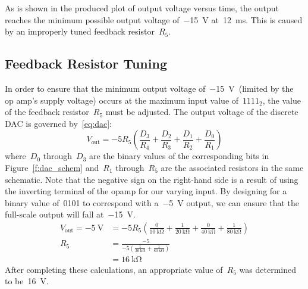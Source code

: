 %
As is shown in the produced plot of output voltage versus time, the output
reaches the minimum possible output voltage of~\SI{-15}{\volt}
at~\SI{12}{\milli\second}.  This is caused by an improperly tuned feedback
resistor~$R_5$.

\subsection{Feedback Resistor Tuning}
In order to ensure that the minimum output voltage of~\SI{-15}{\volt}~(limited
by the op amp's supply voltage) occurs at the maximum input value of~$1111_2$,
the value of the feedback resistor~$R_5$ must be adjusted.  The output voltage
of the discrete DAC is governed by~\eqref{eq:dac}:
%
\begin{equation}
	V_\text{out} = - 5 R_5 \left( \frac{D_3}{R_4} + \frac{D_2}{R_3} + \frac{D_1}{R_2} + \frac{D_0}{R_1} \right)
	\label{eq:dac}
\end{equation}
%
where~$D_0$ through~$D_3$ are the binary values of the corresponding bits in
Figure~\ref{f:dac_schem} and~$R_1$ through~$R_5$ are the associated resistors
in the same schematic.  Note that the negative sign on the right-hand side is a
result of using the inverting terminal of the opamp for our varying input.  By
designing for a binary value of~0101 to correspond with a~\SI{-5}{\volt}
output, we can ensure that the full-scale output will fall at~\SI{-15}{\volt}.
%
\begin{align*}
	V_\text{out} = \SI{-5}{\volt} &= -5 R_5 \left( \frac{0}{\SI{10}{\kilo\ohm}} + \frac{1}{\SI{20}{\kilo\ohm}} + \frac{0}{\SI{40}{\kilo\ohm}} + \frac{1}{\SI{80}{\kilo\ohm}} \right) \\
	R_5 &= \frac{ -5 } { -5 \left( \frac{1}{\SI{20}{\kilo\ohm}} + \frac{1}{\SI{80}{\kilo\ohm}} \right) } \\
	    &= \SI{16}{\kilo\ohm}
\end{align*}
%
After completing these calculations, an appropriate value of~$R_5$ was
determined to be~\SI{16}{\volt}.

